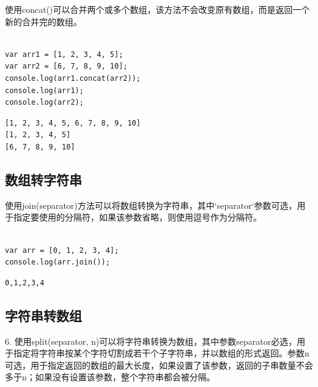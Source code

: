 使用concat()可以合并两个或多个数组，该方法不会改变原有数组，而是返回一个新的合并完的数组。 \\

 \\

\begin{lstlisting}[style=htmlcssjs]
var arr1 = [1, 2, 3, 4, 5];
var arr2 = [6, 7, 8, 9, 10];
console.log(arr1.concat(arr2));
console.log(arr1);
console.log(arr2);
\end{lstlisting}

\begin{tcolorbox}
	\begin{verbatim}
[1, 2, 3, 4, 5, 6, 7, 8, 9, 10]
[1, 2, 3, 4, 5]
[6, 7, 8, 9, 10]
	\end{verbatim}
\end{tcolorbox}

\subsection{数组转字符串}

使用join(separator)方法可以将数组转换为字符串，其中`separator`参数可选，用于指定要使用的分隔符，如果该参数省略，则使用逗号作为分隔符。 \\

 \\

\begin{lstlisting}[style=htmlcssjs]
var arr = [0, 1, 2, 3, 4];
console.log(arr.join());
\end{lstlisting}

\begin{tcolorbox}
	\begin{verbatim}
0,1,2,3,4
	\end{verbatim}
\end{tcolorbox}

\subsection{字符串转数组}

6. 使用split(separator, n)可以将字符串转换为数组，其中参数separator必选，用于指定将字符串按某个字符切割成若干个子字符串，并以数组的形式返回。参数n可选，用于指定返回的数组的最大长度，如果设置了该参数，返回的子串数量不会多于n；如果没有设置该参数，整个字符串都会被分隔。 \\

 \\

